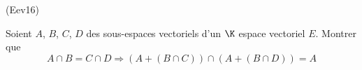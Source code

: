 \begin{tiny}(Eev16)\end{tiny} Soient $A$, $B$, $C$, $D$ des sous-espaces vectoriels d'un $\K$ espace vectoriel $E$. Montrer que 
\begin{displaymath}
 A\cap B = C\cap D \Rightarrow
\left(A+(B\cap C) \right) \cap \left(A+(B\cap D) \right)=A
\end{displaymath}
